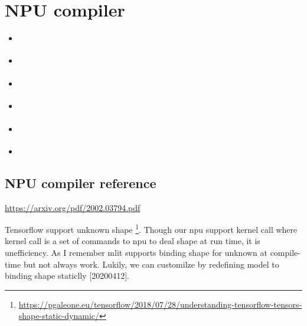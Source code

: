 \documentclass[letterpaper,10pt,english]{sphinxmanual}
\begin{document}
\chapter{NPU compiler}
\label{npu:sec-npu}\label{npu::doc}\label{npu:npu-compiler}
\begin{SphinxShadowBox}
\begin{itemize}
\item {} 
\label{npu:id10}{\hyperref[npu:npu\string-compiler\string-reference]{}}

\item {} 
\label{npu:id11}{\hyperref[npu:mlir\string-and\string-iree]{}}

\item {} 
\label{npu:id12}{\hyperref[npu:tensorflow]{}}

\item {} 
\label{npu:id13}{\hyperref[npu:mlir\string-to\string-onnx]{}}

\item {} 
\label{npu:id14}{\hyperref[npu:llvm\string-ir\string-for\string-npu\string-compiler]{}}

\item {} 
\label{npu:id15}{\hyperref[npu:open\string-source\string-project]{}}

\end{itemize}
\end{SphinxShadowBox}


\section{NPU compiler reference}
\label{npu:npu-compiler-reference}
\url{https://arxiv.org/pdf/2002.03794.pdf}

Tensorflow support unknown shape \footnote[2]{\sphinxAtStartFootnote%
\url{https://pgaleone.eu/tensorflow/2018/07/28/understanding-tensorflow-tensors-shape-static-dynamic/}
}.
Though our npu support kernel call where kernel call is a set of
commands to npu to deal shape at run time, it is unefficiency.
As I remember mlit supports binding shape for unknown at compile-time
but not always work.
Lukily, we can customilze by redefining model to binding shape staticlly {[}20200412{]}.
\end{document}
